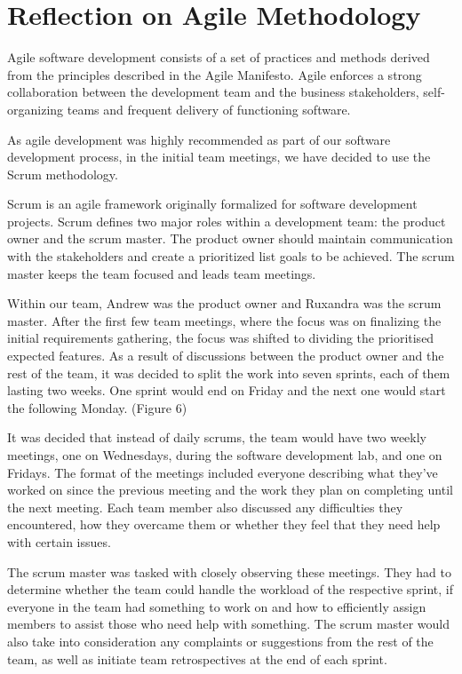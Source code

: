 \documentclass{l3proj}
\begin{document}
\newpage
\section{Reflection on Agile Methodology}
\label{sec:agile}


Agile software development consists of a set of practices and methods derived from the principles described in the Agile Manifesto. Agile enforces a strong collaboration between the development team and the business stakeholders, self-organizing teams and frequent delivery of functioning software.\cite{agile_overview}

As agile development was highly recommended as part of our software development process, in the initial team meetings, we have decided to use the Scrum methodology.
 
 Scrum is an agile framework originally formalized for software development projects. Scrum defines two major roles within a development team: the product owner and the scrum master. The product owner should maintain communication with the stakeholders and create a prioritized list goals to be achieved. The scrum master keeps the team focused and leads team meetings.\cite{scrum_overview}
 
 Within our team, Andrew was the product owner and Ruxandra was the scrum master. After the first few team meetings, where the focus was on finalizing the initial requirements gathering, the focus was shifted to dividing the prioritised expected features. As a result of discussions between the product owner and the rest of the team, it was decided to split the work into seven sprints, each of them lasting two weeks. One sprint would end on Friday and the next one would start the following Monday. (Figure 6)
 
 
 It was decided that instead of daily scrums, the team would have two weekly meetings, one on Wednesdays, during the software development lab, and one on Fridays. The format of the meetings included everyone describing what they've worked on since the previous meeting and the work they plan on completing until the next meeting. Each team member also discussed any difficulties they encountered, how they overcame them or whether they feel that they need help with certain issues.
 
 The scrum master was tasked with closely observing these meetings. They had to determine whether the team could handle the workload of the respective sprint, if everyone in the team had something to work on and how to efficiently assign members to assist those who need help with something. The scrum master would also take into consideration any complaints or suggestions from the rest of the team, as well as initiate team retrospectives at the end of each sprint.
 
\end{document}
